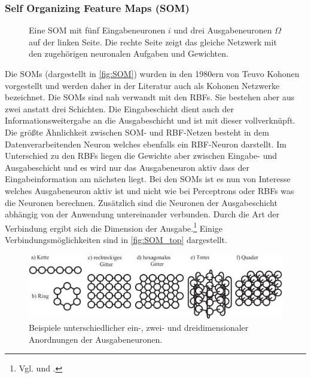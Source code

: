 \subsubsection{Self Organizing Feature Maps (SOM)}
\begin{figure}[!htb]
    \centering
        
    \caption{Eine SOM mit fünf Eingabeneuronen $i$ und drei Ausgabeneuronen $\Omega$ auf der linken Seite. Die rechte Seite zeigt das gleiche Netzwerk mit den zugehörigen neuronalen Aufgaben und Gewichten.}
    \label{fig:SOM}
\end{figure}

Die SOMs (dargestellt in \autoref{fig:SOM}) wurden in den 1980ern von Teuvo Kohonen vorgestellt und werden daher in der Literatur auch als Kohonen Netzwerke bezeichnet. Die SOMs sind nah verwandt mit den RBFs. Sie bestehen aber aus zwei anstatt drei Schichten. Die Eingabeschicht dient auch der Informationsweitergabe an die Ausgabeschicht und ist mit dieser vollverknüpft. Die größte Ähnlichkeit zwischen SOM- und RBF-Netzen besteht in dem Datenverarbeitenden Neuron welches ebenfalls ein RBF-Neuron darstellt. Im Unterschied zu den RBFs liegen die Gewichte aber zwischen Eingabe- und Ausgabeschicht und es wird nur das Ausgabeneuron aktiv dass der Eingabeinformation am nächsten liegt.
Bei den SOMs ist es nun von Interesse welches Ausgabeneuron aktiv ist und nicht wie bei Perceptrons oder RBFs was die Neuronen berechnen. Zusätzlich sind die Neuronen der Ausgabeschicht abhängig von der Anwendung untereinander verbunden. Durch die Art der Verbindung ergibt sich die Dimension der Ausgabe.\footnote{Vgl. \citet[102 ff]{Kruse15} und \citet[153 ff]{dkriesel07}.} Einige Verbindungsmöglichkeiten sind in \autoref{fig:SOM_top} dargestellt.
\begin{figure}[tb]
    \centering
        \includegraphics[width=1\textwidth]{Bilder/Netzwerke/som_top.png}
    \caption{Beispiele unterschiedlicher ein-, zwei- und dreidimensionaler Anordnungen der Ausgabeneuronen.\protect\footnotemark{}}
    \label{fig:SOM_top}
\end{figure}
\addtocounter{footnote}{-1}     %
\addtocounter{Hfootnote}{-1}    %
\wrapfigfoot{}


